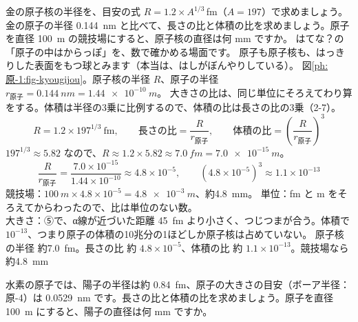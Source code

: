 \label{ph:原-1:ex1}
\begin{phreidai}
金の原子核の半径を、目安の式 $R=1.2\times A^{1/3}$\,fm（$A=197$）で求めましょう。金の原子の半径 \qty{0.144}{nm} と比べて、長さの比と体積の比を求めましょう。原子を直径 \qty{100}{m} の競技場にすると、原子核の直径は何 mm ですか。
\phbamen
はてな？の「原子の中はからっぽ」を、数で確かめる場面です。
\phmushi
原子も原子核も、はっきりした表面をもつ球とみます（本当は、はしがぼんやりしている）。
\phzu
図\ref{ph:原-1:fig-kyougijou}。原子核の半径 $R$、原子の半径 $r_{\text{原子}}=\qty{0.144}{nm}=\qty{1.44e-10}{m}$。
\phriyu
大きさの比は、同じ単位にそろえてわり算をする。体積は半径の3乗に比例するので、体積の比は長さの比の3乗（2-7）。
\phtateru
\[ R=1.2\times197^{1/3}\ \mathrm{fm},\qquad\text{長さの比}=\frac{R}{r_{\text{原子}}},\qquad\text{体積の比}=\left(\frac{R}{r_{\text{原子}}}\right)^3 \]
\phtoku
$197^{1/3}\approx5.82$ なので、$R\approx1.2\times5.82\approx\qty{7.0}{fm}=\qty{7.0e-15}{m}$。
\[ \frac{R}{r_{\text{原子}}}=\frac{7.0\times10^{-15}}{1.44\times10^{-10}}\approx4.8\times10^{-5},\qquad (4.8\times10^{-5})^3\approx1.1\times10^{-13} \]
競技場：$\qty{100}{m}\times4.8\times10^{-5}=\qty{4.8e-3}{m}$、約\qty{4.8}{mm}。
\phtashikame
単位：fm と m をそろえてからわったので、比は単位のない数。\\
大きさ：⑤で、α線が近づいた距離 \qty{45}{fm} より小さく、つじつまが合う。体積で $10^{-13}$、つまり原子の体積の10兆分の1ほどしか原子核は占めていない。
\kotae 原子核の半径 約\qty{7.0}{fm}。長さの比 約 $4.8\times10^{-5}$、体積の比 約 $1.1\times10^{-13}$。競技場なら約\qty{4.8}{mm}
\end{phreidai}
\begin{jibun}
水素の原子では、陽子の半径は約 \qty{0.84}{fm}、原子の大きさの目安（ボーア半径：原-4）は \qty{0.0529}{nm} です。長さの比と体積の比を求めましょう。原子を直径 \qty{100}{m} にすると、陽子の直径は何 mm ですか。
\end{jibun}

